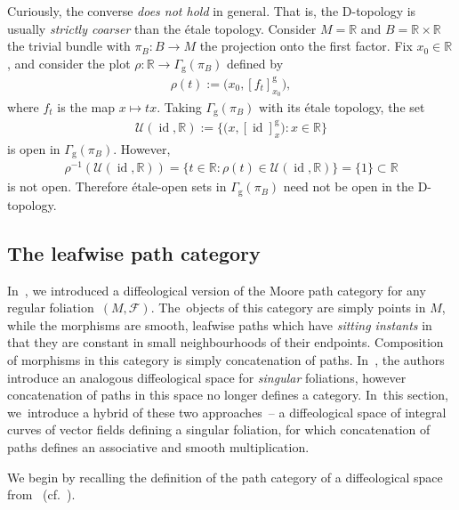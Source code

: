 \documentclass[10pt,a4paper]{amsart}
\numberwithin{equation}{section}
\def\g{\operatorname{g}}
\def\id{\operatorname{id}}
\def\FF{{\mathcal{F}}}
\def\UU{{\mathcal{U}}}
\def\RB{{\mathbb{R}}}
\begin{document}
\begin{Remark}
Curiously, the converse \textit{does not hold} in general. That is, the D-topology is usually \textit{strictly coarser} than the \'{e}tale topology. Consider $M = \RB$ and $B=\RB\times\RB$ the trivial bundle with $\pi_{B}\colon B\rightarrow M$ the projection onto the first factor. Fix $x_{0}\in\RB$, and consider the plot $\rho\colon \RB\rightarrow\Gamma_{\g}(\pi_{B})$ defined by
\begin{gather*}
\rho(t):=\big(x_{0},[f_{t}]^{\g}_{x_{0}}\big),
\end{gather*}
where $f_{t}$ is the map $x\mapsto tx$. Taking $\Gamma_{\g}(\pi_{B})$ with its \'{e}tale topology, the set
\begin{gather*}
\UU(\id,\RB):=\big\{\big(x,[\id]^{\g}_{x}\big)\colon x\in\RB\big\}
\end{gather*}
is open in $\Gamma_{\g}(\pi_{B})$. However,
\begin{gather*}
\rho^{-1}(\UU(\id,\RB)) = \{t\in\RB\colon \rho(t)\in\UU(\id,\RB)\} = \{1\}\subset\RB
\end{gather*}
is not open. Therefore \'{e}tale-open sets in $\Gamma_{\g}(\pi_{B})$ need not be open in the D-topology.
\end{Remark}

\subsection{The leafwise path category}

In~\cite{mac3}, we introduced a diffeological version of the Moore path category for any regular folia\-tion~$(M,\FF)$. The~objects of this category are simply points in $M$, while the morphisms are smooth, leafwise paths which have \textit{sitting instants} in that they are constant in small neighbourhoods of their endpoints. Composition of morphisms in this category is simply concatenation of paths. In~\cite{VilGar1}, the authors introduce an analogous diffeological space for \textit{singular} foliations, however concatenation of paths in this space no longer defines a category. In~this section, we~intro\-duce a hybrid of these two approaches~-- a diffeological space of integral curves of vector fields defining a singular foliation, for which concatenation of paths defines an associative and smooth multiplication.

We begin by recalling the definition of the path category of a diffeological space from~\cite{mac3} (cf.~\cite{ptfunctor}).
\end{document}

